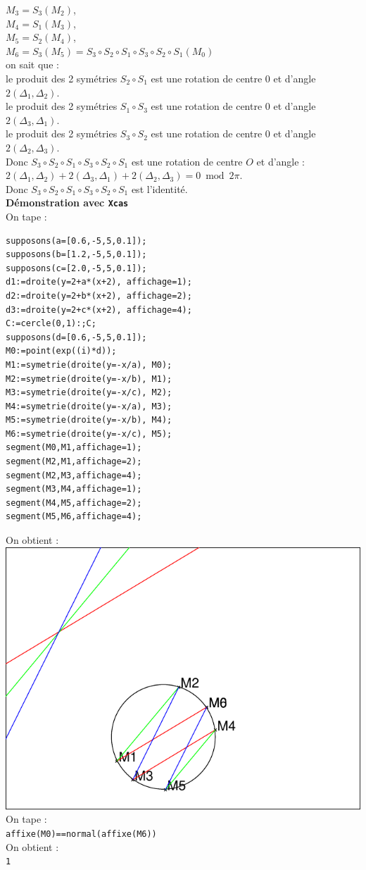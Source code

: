 \documentclass[a4paper,11pt]{book}
\begin{document}
$M_3=S_3(M_2)$,\\
$M_4=S_1(M_3)$,\\
$M_5=S_2(M_4)$,\\
$M_6=S_3(M_5)=S_3\circ S_2\circ S_1\circ S_3\circ S_2\circ S_1(M_0)$\\
on sait que :\\
le produit des 2 sym\'etries $S_2\circ S_1$ est une rotation de 
centre $0$ et d'angle $2(\Delta_1,\Delta_2)$.\\
le produit des 2 sym\'etries $S_1\circ S_3$ est une rotation de 
centre $0$ et d'angle $2(\Delta_3,\Delta_1)$.\\
le produit des 2 sym\'etries $S_3\circ S_2$ est une rotation de 
centre $0$ et d'angle $2(\Delta_2,\Delta_3)$.\\
Donc $S_3\circ S_2\circ S_1\circ S_3\circ S_2\circ S_1$ est une rotation de centre $O$ et d'angle :\\
$2(\Delta_1,\Delta_2)+2(\Delta_3,\Delta_1)+2(\Delta_2,\Delta_3)=0 \bmod 2\pi$.\\
Donc  $S_3\circ S_2\circ S_1\circ S_3\circ S_2\circ S_1$ est l'identit\'e.\\

{\bf D\'emonstration avec {\tt Xcas}}\\
On tape :
\begin{verbatim}
supposons(a=[0.6,-5,5,0.1]);
supposons(b=[1.2,-5,5,0.1]);
supposons(c=[2.0,-5,5,0.1]);
d1:=droite(y=2+a*(x+2), affichage=1);
d2:=droite(y=2+b*(x+2), affichage=2);
d3:=droite(y=2+c*(x+2), affichage=4);
C:=cercle(0,1):;C;
supposons(d=[0.6,-5,5,0.1]);
M0:=point(exp((i)*d));
M1:=symetrie(droite(y=-x/a), M0);
M2:=symetrie(droite(y=-x/b), M1);
M3:=symetrie(droite(y=-x/c), M2);
M4:=symetrie(droite(y=-x/a), M3);
M5:=symetrie(droite(y=-x/b), M4);
M6:=symetrie(droite(y=-x/c), M5);
segment(M0,M1,affichage=1);
segment(M2,M1,affichage=2);
segment(M2,M3,affichage=4);
segment(M3,M4,affichage=1);
segment(M4,M5,affichage=2);
segment(M5,M6,affichage=4);
\end{verbatim}
On obtient :\\
\includegraphics[width=\textwidth]{cassymd}
On tape :\\
{\tt affixe(M0)==normal(affixe(M6))}\\
On obtient :\\
{\tt 1}
\end{document}
